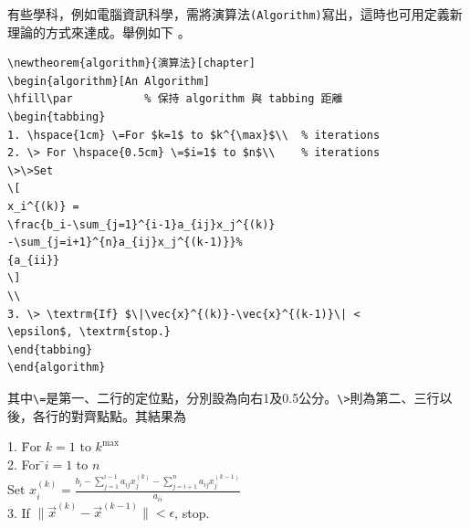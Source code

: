 有些學科，例如電腦資訊科學，需將演算法{\tt(Algorithm)}寫出，這時也可用定義新理論的方式來達成。舉例如下
。
\begin{Verbatim}[frame=single,firstline=1,label={An algorithm}]
\newtheorem{algorithm}{演算法}[chapter]
\begin{algorithm}[An Algorithm]
\hfill\par           % 保持 algorithm 與 tabbing 距離
\begin{tabbing}
1. \hspace{1cm} \=For $k=1$ to $k^{\max}$\\  % iterations
2. \> For \hspace{0.5cm} \=$i=1$ to $n$\\    % iterations
\>\>Set
\[
x_i^{(k)} =
\frac{b_i-\sum_{j=1}^{i-1}a_{ij}x_j^{(k)}
-\sum_{j=i+1}^{n}a_{ij}x_j^{(k-1)}}%
{a_{ii}}
\]
\\
3. \> \textrm{If} $\|\vec{x}^{(k)}-\vec{x}^{(k-1)}\| < 
\epsilon$, \textrm{stop.}
\end{tabbing}
\end{algorithm}
\end{Verbatim}
其中\verb+\=+是第一、二行的定位點，分別設為向右1及0.5公分。\verb+\>+則為第二、三行以後，各行的對齊點點。其結果為 
\begin{algorithm}[An Algorithm]
\hfill\par   %
\begin{tabbing}
1. \hspace{1cm} \=For $k=1$ to $k^{\max}$ \\   
2. \> For \hspace{0.5cm}\=$i=1$ to $n$\\   
\>\> Set
$
x_i^{(k)} =
\frac{b_i-\sum_{j=1}^{i-1}a_{ij}x_j^{(k)}
-\sum_{j=i+1}^{n}a_{ij}x_j^{(k-1)}} {a_{ii}}
$\\
3. \>\textrm{If} $\|\vec{x}^{(k)}-\vec{x}^{(k-1)}\| < \epsilon$, \textrm{stop.}
\end{tabbing}
\end{algorithm}
